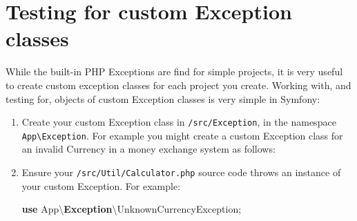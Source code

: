 \documentclass[a4paperpaper,openright]{book}
\newenvironment{Shaded}{}{}
\newcommand{\CommentTok}[1]{\textcolor[rgb]{0.38,0.63,0.69}{\textit{#1}}}
\newcommand{\FunctionTok}[1]{\textcolor[rgb]{0.02,0.16,0.49}{#1}}
\newcommand{\KeywordTok}[1]{\textcolor[rgb]{0.00,0.44,0.13}{\textbf{#1}}}
\newcommand{\NormalTok}[1]{#1}
\newcommand{\OtherTok}[1]{\textcolor[rgb]{0.00,0.44,0.13}{#1}}
\newcommand{\StringTok}[1]{\textcolor[rgb]{0.25,0.44,0.63}{#1}}
\begin{document}
\hypertarget{testing-for-custom-exception-classes}{%
\section{Testing for custom Exception
classes}\label{testing-for-custom-exception-classes}}

While the built-in PHP Exceptions are find for simple projects, it is
very useful to create custom exception classes for each project you
create. Working with, and testing for, objects of custom Exception
classes is very simple in Symfony:

\begin{enumerate}
\def\labelenumi{\arabic{enumi}.}
\item
  Create your custom Exception class in \texttt{/src/Exception}, in the
  namespace \texttt{App\textbackslash{}Exception}. For example you might
  create a custom Exception class for an invalid Currency in a money
  exchange system as follows:

\begin{Shaded}
\end{Shaded}
\item
  Ensure your \texttt{/src/Util/Calculator.php} source code throws an
  instance of your custom Exception. For example:

\begin{Shaded}
\begin{Highlighting}[]
    \KeywordTok{use}\NormalTok{ App\textbackslash{}}\KeywordTok{Exception}\NormalTok{\textbackslash{}UnknownCurrencyException}\OtherTok{;}


\end{Highlighting}
\end{Shaded}
\end{enumerate}
\end{document}
